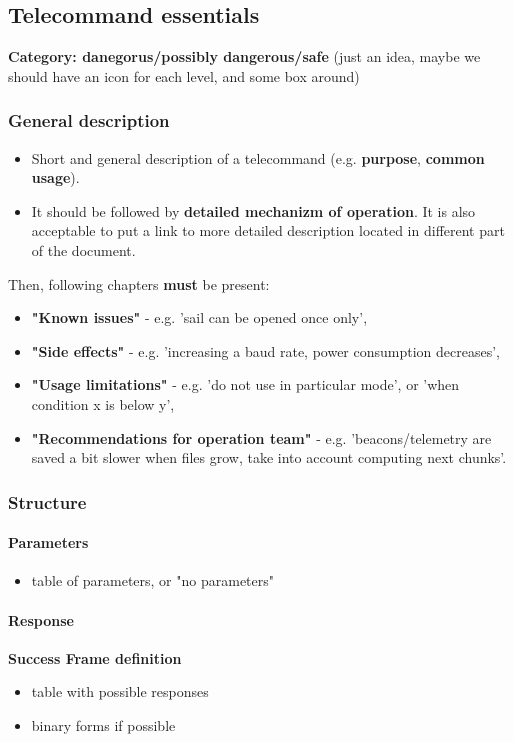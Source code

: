 \subsection{Telecommand essentials}

\textbf{Category: danegorus/possibly dangerous/safe} (just an idea, maybe we should have an icon for each level, and some box around)

\subsubsection{General description}
\begin{itemize}
    \item Short and general description of a telecommand (e.g. \textbf{purpose}, \textbf{common usage}).
    \item It should be followed by \textbf{detailed mechanizm of operation}. It is also acceptable to put a link to more detailed description located in different part of the document.
\end{itemize}

Then, following chapters \textbf{must} be present:
\begin{itemize}
    \item \textbf{"Known issues"} - e.g. 'sail can be opened once only',
    \item \textbf{"Side effects"} - e.g. 'increasing a baud rate, power consumption decreases',
    \item \textbf{"Usage limitations"} - e.g. 'do not use in particular mode', or 'when condition x is below y',
    \item \textbf{"Recommendations for operation team"} - e.g. 'beacons/telemetry are saved a bit slower when files grow, take into account computing next chunks'.
\end{itemize}

\subsubsection{Structure}

\paragraph{Parameters}
    \begin{itemize}
    \item table of parameters, or "no parameters"
    \end{itemize}


\paragraph{Response}
    \textbf{Success Frame definition}
    \begin{itemize}
        \item table with possible responses
        \item binary forms if possible
    \end{itemize}


